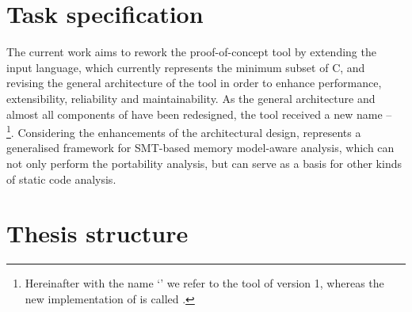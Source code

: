 

\section{Task specification}
\label{ch:intro:task}

The current work aims to rework the proof-of-concept tool \textit{\porthos{}} by extending the input language, which currently represents the minimum subset of C, and revising the general architecture of the tool in order to enhance performance, extensibility, reliability and maintainability.
As the general architecture and almost all components of \porthos{} have been redesigned, the tool received a new name -- \textit{\porthos[2]}\,%
%
\footnote{Hereinafter with the name `\porthos{}' we refer to the tool \porthos{} of version 1, whereas the new implementation of \porthos{} is called \porthos[2].}. %
%
Considering the enhancements of the architectural design, \porthos[2] represents a generalised framework for SMT-based memory model-aware analysis, which can not only perform the portability analysis, but can serve as a basis for other kinds of static code analysis.


\section{Thesis structure}
\label{ch:intro:structure}

